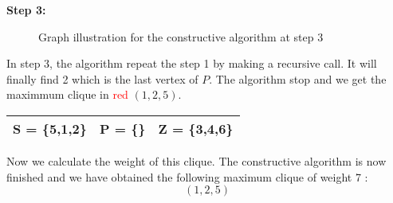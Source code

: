    \vspace{1\baselineskip}

    \begin{minipage}{\linewidth}
        \textbf{Step 3:} \newline
        \begin{minipage}{0.4\textwidth}
            \begin{figure}[H]
                \centering
                \caption{Graph illustration for the constructive algorithm at step 3}
                \label{fig:constructive-mewc-edge-step3}
            \end{figure}
        \end{minipage}
        \begin{minipage}{0.6\textwidth}
            In step 3, the algorithm repeat the step 1 by making a recursive call. It will finally find 2 which is the last vertex of $P$. The algorithm stop and we get the maximmum clique in \textcolor{red}{red} $(1,2,5)$.
    
            \begin{center}
                \begin{tabular}{|lll|}
                    \hline
                    S = \{5,1,2\} & P = \{\} & Z = \{3,4,6\} \\
                    \hline
                \end{tabular}
            \end{center}
        \end{minipage}
    \end{minipage}

    \vspace{1\baselineskip}

    Now we calculate the weight of this clique. The constructive algorithm is now finished and we have obtained the following maximum clique of weight 7 : $$(1,2,5)$$

\newpage

